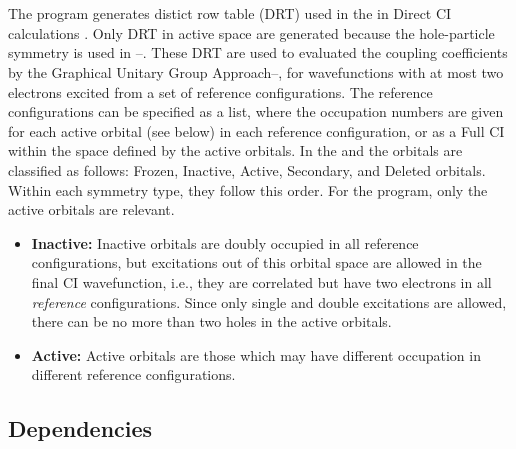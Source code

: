 
\section{}
\label{UG:sec:Gugadrt}

The  program generates distict row table (DRT)
used in the 
in Direct CI calculations\cite{Roos:72} .
Only DRT in active space are generated because
the hole-particle symmetry is used in \cite{YBWang:1}--\cite{BSuo:1}.
These DRT are used to evaluated the coupling coefficients
by the Graphical Unitary 
Group Approach\cite{Shavitt:77}--\cite{Siegbahn:80},
for wavefunctions with at most two electrons excited from a set of
reference configurations. The reference configurations can be specified as a
list, where the occupation numbers are given for each active orbital
(see below) in each reference configuration, or as a Full CI
 within
the space defined by the active orbitals. In the  and 
the orbitals are classified as follows:
Frozen, Inactive, Active, Secondary, and Deleted orbitals. Within each
symmetry type, they follow this order. For the  program,
only the active orbitals are relevant.

\begin{itemize}
\itemsep 9pt plus 3pt minus 3pt
\item
{\bf Inactive:} Inactive orbitals are doubly occupied
in all reference configurations, but excitations out of this orbital
space are allowed in the final CI wavefunction, i.e., they are
correlated but have two electrons in all {\em reference} configurations.
Since only single and double excitations are allowed, there can be no
more than two holes in the active orbitals.
\item
{\bf Active:} Active orbitals are those which may have
different occupation in different reference configurations.
\end{itemize}

\subsection{Dependencies}
\label{UG:sec:gugadrt_dependencies}

